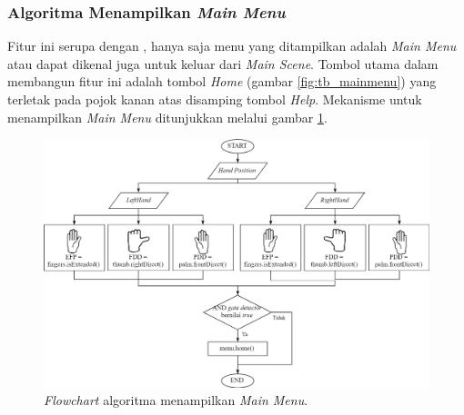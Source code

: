 		 \subsubsection{Algoritma Menampilkan \textit{Main Menu}}
		 \label{section:mainmenu}
		 \vspace{0.5ex}
		 	Fitur ini serupa dengan , hanya saja menu yang ditampilkan adalah \textit{Main Menu} atau dapat dikenal juga untuk keluar dari \textit{Main Scene}. Tombol utama dalam membangun fitur ini adalah tombol \textit{Home} (gambar \ref{fig:tb_mainmenu}) yang terletak pada pojok kanan atas disamping tombol \textit{Help}. Mekanisme untuk menampilkan \textit{Main Menu} ditunjukkan melalui gambar \ref{fig:flow_home}.  
		 	\begin{figure} [H]
		 		\includegraphics[width=\textwidth]{img/bab3/flow_home.png}
		 		\caption{\textit{Flowchart} algoritma menampilkan \textit{Main Menu}.}
		 		\label{fig:flow_home}
		 	\end{figure}
	 		\vspace{-2ex}
		 	
